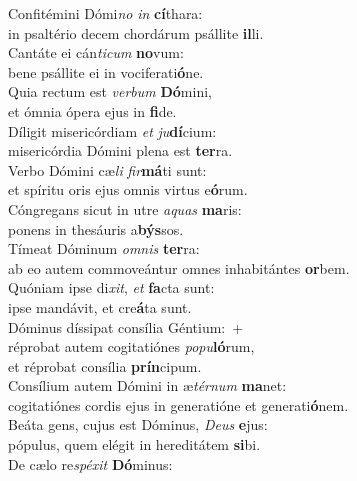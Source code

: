 \evenverse Confitémini Dómi\textit{no} \textit{in} \textbf{cí}thara:~\*\\
\evenverse in psaltério decem chordárum psállite \textbf{il}li.\\
\oddverse Cantáte ei cán\textit{ti}\textit{cum} \textbf{no}vum:~\*\\
\oddverse bene psállite ei in vociferati\textbf{ó}ne.\\
\evenverse Quia rectum est \textit{ver}\textit{bum} \textbf{Dó}mini,~\*\\
\evenverse et ómnia ópera ejus in \textbf{fi}de.\\
\oddverse Díligit misericórdiam \textit{et} \textit{ju}\textbf{dí}cium:~\*\\
\oddverse misericórdia Dómini plena est \textbf{ter}ra.\\
\evenverse Verbo Dómini cæ\textit{li} \textit{fir}\textbf{má}ti sunt:~\*\\
\evenverse et spíritu oris ejus omnis virtus e\textbf{ó}rum.\\
\oddverse Cóngregans sicut in utre \textit{a}\textit{quas} \textbf{ma}ris:~\*\\
\oddverse ponens in thesáuris a\textbf{býs}sos.\\
\evenverse Tímeat Dóminum \textit{om}\textit{nis} \textbf{ter}ra:~\*\\
\evenverse ab eo autem commoveántur omnes inhabitántes \textbf{or}bem.\\
\oddverse Quóniam ipse di\textit{xit}, \textit{et} \textbf{fa}cta sunt:~\*\\
\oddverse ipse mandávit, et cre\textbf{á}ta sunt.\\
\evenverse Dóminus díssipat consília Géntium:~+\\
\evenverse  réprobat autem cogitatiónes \textit{po}\textit{pu}\textbf{ló}rum,~\*\\
\evenverse et réprobat consília \textbf{prín}cipum.\\
\oddverse Consílium autem Dómini in æ\textit{tér}\textit{num} \textbf{ma}net:~\*\\
\oddverse cogitatiónes cordis ejus in generatióne et generati\textbf{ó}nem.\\
\evenverse Beáta gens, cujus est Dóminus, \textit{De}\textit{us} \textbf{e}jus:~\*\\
\evenverse pópulus, quem elégit in hereditátem \textbf{si}bi.\\
\oddverse De cælo re\textit{spé}\textit{xit} \textbf{Dó}minus:~\*\\
